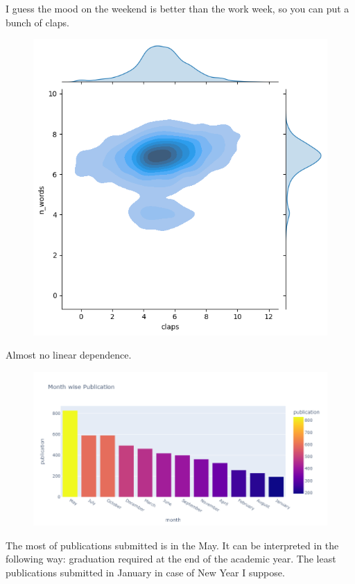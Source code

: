 \documentclass[12pt]{report}
\begin{document}
I guess the mood on the weekend is better than the work week, so you can put a bunch of claps.
\begin{figure}[H]
    \centering
    \includegraphics[scale=0.5]{eda7.png}
\end{figure}
Almost no linear dependence.
\begin{figure}[H]
    \centering
    \includegraphics[scale=0.4]{eda8.png}
\end{figure}
The most of publications submitted is in the May. It can be interpreted in the following way: graduation required at the end of the academic year. The least publications submitted in January in case of New Year I suppose.
\end{document}
